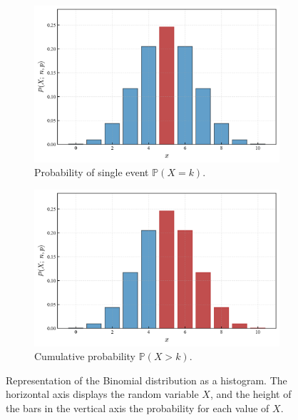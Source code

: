 \documentclass{book}
\begin{document}
\begin{figure}[ht]
    \centering
    \begin{subfigure}[b]{0.48\textwidth}
        \centering
        \includegraphics[width=\textwidth, height=0.7\textwidth]{figures/chapter2/binomial_1.png}
        \caption{Probability of single event $\mathbb{P} (X = k)$.}
        \label{fig:binomial1}
    \end{subfigure}
    \hfill
    \begin{subfigure}[b]{0.48\textwidth}
        \centering
        \includegraphics[width=\textwidth, height=0.7\textwidth]{figures/chapter2/binomial_1_cum.png}
        \caption{Cumulative probability $\mathbb{P} (X > k)$.}
        \label{fig:binomial1_cum}
    \end{subfigure}
    \caption{Representation of the Binomial distribution as a histogram. The horizontal axis displays the random variable $X$, and the height of the bars in the vertical axis the probability for each value of $X$.}
    \label{fig:binomial_comparison}
\end{figure}
\end{document}
